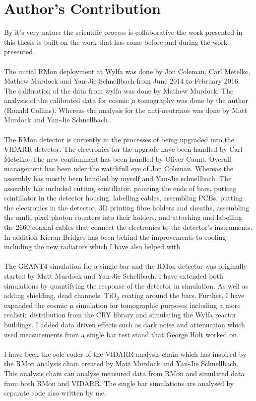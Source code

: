 \chapter{Author's Contribution}

By it's very nature the scientific process is collaborative the work presented in this thesis is built on the work that has come before and during the work presented. 
\\\\The initial RMon deployment at Wylfa was done by Jon Coleman, Carl Metelko, Mathew Murdock and Yan-Jie Schnellbach from June 2014 to February 2016. The calibration of the data from wylfa was done by Mathew Murdock. The analysis of the calibrated data for cosmic $\mu$ tomography was done by the author (Ronald Collins). Whereas the analysis for the anti-neutrinos was done by Matt Murdock and Yan-Jie Schnellbach. 
\\\\The RMon detector is currently in the processes of being upgraded into the VIDARR detector. The electronics for the upgrade have been handled by Carl Metelko. The new contianment has been handled by Oliver Caunt. Overall management has been uder the watchfull eye of Jon Coleman. Whereas the assembly has mostly been handled by myself and Yan-Jie schnellbach. The assembly has included cutting scintillator, painting the ends of bars, putting scintillator in the detector housing, labelling cables, assembling PCBs, putting the electronics in the detector, 3D printing fibre holders and sheaths, assembling the multi pixel photon counters into their holders, and attaching and labelling the 2660 coaxial cables that connect the electronics to the detector's instruments. In addition Kieran Bridges has been behind the improvements to cooling including the new radiators which I have also helped with. 
\\\\The GEANT4 simulation for a single bar and the RMon detector was originally started by Matt Murdock and Yan-Jie Schellbach. I have extended both simulations by quantifying the response of the detector in simulation. As well as adding shielding, dead channels, TiO$_2$ coating around the bars. Further, I have expanded the cosmic $\mu$  simulation for tomographic purposes including a more realistic distribution from the CRY library and simulating the Wylfa reactor buildings. I added data driven effects such as dark noise and attenuation which used measurements from a single bar test stand that George Holt worked on. 
\\\\I have been the sole coder of the VIDARR analysis chain which has inspired by the RMon analysis chain created by Matt Murdock and Yan-Jie Schnellbach. This analysis chain can analyse measured data from RMon and simulated data from both RMon and VIDARR. The single bar simulations are analysed by separate code also written by me. 
